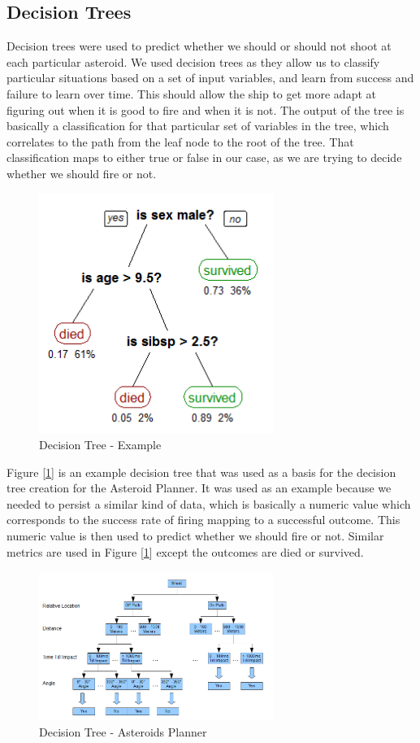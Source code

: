 \documentclass[10pt,final,conference]{IEEEtran}
\begin{document}
\subsection{Decision Trees}
Decision trees were used to predict whether we should or should not shoot at each particular asteroid.  We used decision trees as they allow us to classify particular situations based on a set of input variables, and learn from success and failure to learn over time.  This should allow the ship to get more adapt at figuring out when it is good to fire and when it is not.  The output of the tree is basically a classification for that particular set of variables in the tree, which correlates to the path from the leaf node to the root of the tree.  That classification maps to either true or false in our case, as we are trying to decide whether we should fire or not.

\begin{figure}
\centering
\includegraphics[width=3.0in]{./CART_tree_titanic_survivors.png}
\caption{Decision Tree - Example\cite{titanic}}
\label{fig_decision_tree_example}
\end{figure}

Figure [\ref{fig_decision_tree_example}] is an example decision tree that was used as a basis for the decision tree creation for the Asteroid Planner\cite{wikiDecisionTreeLearning}.  It was used as an example because we needed to persist a similar kind of data, which is basically a numeric value which corresponds to the success rate of firing mapping to a successful outcome.  This numeric value is then used to predict whether we should fire or not.  Similar metrics are used in Figure [\ref{fig_decision_tree_example}] except the outcomes are died or survived.

\begin{figure}
\centering
\includegraphics[width=3.0in]{./DecisionTree.png}
\caption{Decision Tree - Asteroids Planner}
\label{fig_decision_tree_asteroids}
\end{figure}
\end{document}
